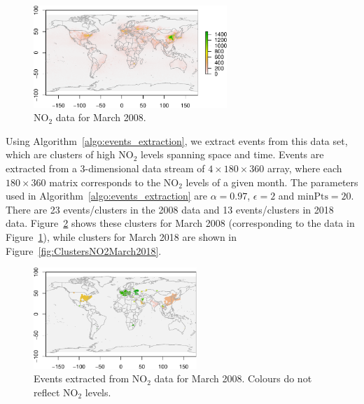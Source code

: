 \documentclass[a4paper,11pt]{article}
\begin{document}
\begin{figure}[!htb]
	\centering
		\includegraphics[width=0.65\textwidth]{./Graphics/NO2_March_2008_With_Bndry.pdf}
	\caption{$\text{NO}_2$ data for March 2008.}
	\label{fig:NO2March2008}
\end{figure}

Using Algorithm~\ref{algo:events_extraction}, we extract events from this data set, which are clusters of high $\text{NO}_2$ levels spanning space and time. Events are extracted from a 3-dimensional data stream of $4 \times 180 \times 360$ array, where each $180 \times 360$ matrix corresponds to the $\text{NO}_2$ levels of a given month. The parameters used in Algorithm~\ref{algo:events_extraction} are $\alpha = 0.97$, $\epsilon=2$ and $\text{minPts} = 20$. There are 23 events/clusters in the 2008 data and 13 events/clusters in 2018 data. Figure~\ref{fig:ClustersNO2March2008} shows these clusters for March 2008 (corresponding to the data in Figure~\ref{fig:NO2March2008}), while clusters for March 2018 are shown in Figure~\ref{fig:ClustersNO2March2018}.

\begin{figure}[!hb]
	\centering
		\includegraphics[width=0.55\textwidth]{./Graphics/Clusters_NO2_March_2008_With_Bndry.pdf}
	\caption{Events extracted from $\text{NO}_2$ data for March 2008. Colours do not reflect $\text{NO}_2$ levels.}
	\label{fig:ClustersNO2March2008}
\end{figure}
\end{document}
